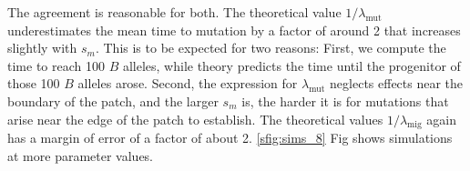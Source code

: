 \documentclass[10pt,letterpaper]{article}
\newcommand{\migrate}{\lambda_\text{mig}}
\newcommand{\mutrate}{\lambda_\text{mut}}
\begin{document}
The agreement is reasonable for both.
The theoretical value $1/\mutrate$ underestimates the mean time to mutation
by a factor of around 2 that increases slightly with $s_m$.
This is to be expected for two reasons:
First, we compute the time to reach 100 $B$ alleles, while theory predicts
the time until the progenitor of those 100 $B$ alleles arose.
Second, the expression for $\mutrate$ neglects effects near the boundary of the patch,
and the larger $s_m$ is, 
the harder it is for mutations that arise near the edge of the patch to establish.
The theoretical values $1/\migrate$ again has a margin of error of a factor of about 2.
\ref{sfig:sims_8} Fig shows simulations at more parameter values.
\end{document}
